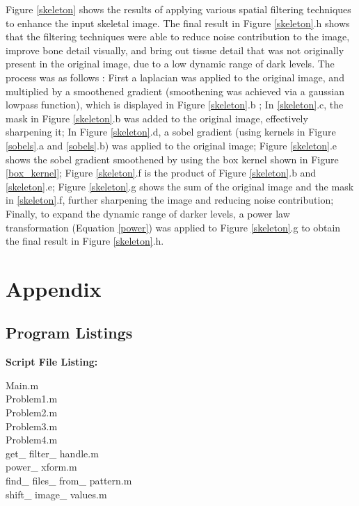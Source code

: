 \documentclass[./rarnold_report3.tex]{subfiles}
\begin{document}
Figure \ref{skeleton} shows the results of applying various spatial filtering techniques to enhance the input skeletal image.  The final result in Figure \ref{skeleton}.h shows that the filtering techniques were able to reduce noise contribution to the image, improve bone detail visually, and bring out tissue detail that was not originally present in the original image, due to a low dynamic range of dark levels.   The process was as follows : First a laplacian was applied to the original image, and multiplied by a smoothened gradient (smoothening was achieved via a gaussian lowpass function), which is displayed in Figure \ref{skeleton}.b ; In \ref{skeleton}.c, the mask in Figure \ref{skeleton}.b was added to the original image, effectively sharpening it; In Figure \ref{skeleton}.d, a sobel gradient (using kernels in Figure \ref{sobels}.a and \ref{sobels}.b) was applied to the original image; Figure \ref{skeleton}.e shows the sobel gradient smoothened by using the box kernel shown in Figure \ref{box_kernel}; Figure \ref{skeleton}.f is the product of Figure \ref{skeleton}.b and \ref{skeleton}.e; Figure \ref{skeleton}.g shows the sum of the original image and the mask in \ref{skeleton}.f, further sharpening the image and reducing noise contribution; Finally, to expand the dynamic range of darker levels, a power law transformation (Equation \eqref{power}) was applied to Figure \ref{skeleton}.g to obtain the final result in Figure \ref{skeleton}.h.  

\clearpage

\section*{Appendix}
\subsection*{Program Listings}

\noindent \textbf{Script File Listing:}

\noindent Main.m \\
Problem1.m \\
Problem2.m \\
Problem3.m \\
Problem4.m \\
get\_ filter\_ handle.m \\
power\_ xform.m \\
find\_ files\_ from\_ pattern.m \\
shift\_ image\_ values.m \\
\end{document}
